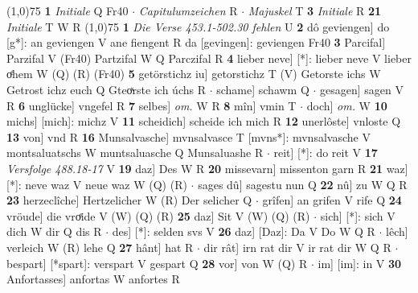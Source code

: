 \documentclass[8pt,a4paper,notitlepage]{article}
\begin{document}
\begin{table}[ht]
\begin{minipage}[t]{0.5\linewidth}
\line(1,0){75} \newline
\textbf{1} \textit{Initiale} Q Fr40   $\cdot$ \textit{Capitulumzeichen} R   $\cdot$ \textit{Majuskel} T  \textbf{3} \textit{Initiale} R  \textbf{21} \textit{Initiale} T W R  \newline
\line(1,0){75} \newline
\textbf{1} \textit{Die Verse 453.1-502.30 fehlen} U  \textbf{2} dô geviengen] do [g*]: an geviengen V ane fiengent R da [gevingen]: geviengen Fr40 \textbf{3} Parcifal] Parzifal V (Fr40) Partzifal W Q Parczifal R \textbf{4} lieber neve] [*]: lieber neve V lieber oͤhem W (Q) (R) (Fr40) \textbf{5} getörstichz iu] getorstichz T (V) Getorste ichs W Getrost ichz euch Q Gteoͯrste ich úchs R  $\cdot$ schame] schawm Q  $\cdot$ gesagen] sagen V R \textbf{6} unglücke] vngefel R \textbf{7} selbes] \textit{om.} W R \textbf{8} mîn] vmin T  $\cdot$ doch] \textit{om.} W \textbf{10} michs] [mich]: michz V \textbf{11} scheidich] scheide ich mich R \textbf{12} unerlôste] vnloste Q \textbf{13} von] vnd R \textbf{16} Munsalvasche] mvnsalvasce T [mvns*]: mvnsalvasche V montsaluatschs W muntsaluasche Q Munsaluashe R  $\cdot$ reit] [*]: do reit V \textbf{17} \textit{Versfolge 488.18-17} V  \textbf{19} daz] Des W R \textbf{20} missevarn] missenton garn R \textbf{21} waz] [*]: neve waz V neue waz W (Q) (R)  $\cdot$ sages dû] sagestu nun Q \textbf{22} nû] zu W Q R \textbf{23} herzeclîche] Hertzelicher W (R) Der selicher Q  $\cdot$ grîfen] an grifen V rife Q \textbf{24} vröude] die vroͤide V (W) (Q) (R) \textbf{25} daz] Sit V (W) (Q) (R)  $\cdot$ sich] [*]: sich V dich W dir Q dis R  $\cdot$ des] [*]: selden svs V \textbf{26} daz] [Daz]: Da V Do W Q R  $\cdot$ lêch] verleich W (R) lehe Q \textbf{27} hânt] hat R  $\cdot$ dir rât] irn rat dir V ir rat dir W Q R  $\cdot$ bespart] [*spart]: verspart V gespart Q \textbf{28} vor] von W (Q) R  $\cdot$ im] [im]: in V \textbf{30} Anfortasses] anfortas W anfortes R \newline
\end{minipage}
\end{table}
\end{document}
